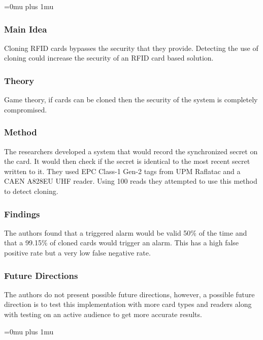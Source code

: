 \Urlmuskip=0mu plus 1mu\relax

\subsubsection{Main Idea}

\noindent
Cloning RFID cards bypasses the security that they provide.  Detecting the use of cloning could increase the security of an RFID card based solution.

\subsubsection{Theory}

\noindent
Game theory, if cards can be cloned then the security of the system is completely compromised.

\subsubsection{Method}

\noindent
The researchers developed a system that would record the synchronized secret on the card.  It would then check if the secret is identical to the most recent secret written to it.  They used EPC Class-1 Gen-2 tags from UPM Raflatac and a CAEN A828EU UHF reader.  Using 100 reads they attempted to use this method to detect cloning.

\subsubsection{Findings}

\noindent
The authors found that a triggered alarm would be valid 50\% of the time and that a 99.15\% of cloned cards would trigger an alarm.  This has a high false positive rate but a very low false negative rate.

\subsubsection{Future Directions}

\noindent
The authors do not present possible future directions, however, a possible future direction is to test this implementation with more card types and readers along with testing on an active audience to get more accurate results. 

\Urlmuskip=0mu plus 1mu\relax
\pagebreak
